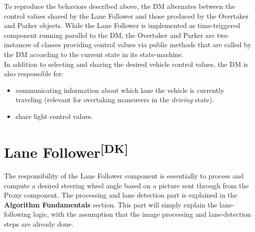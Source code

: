 \noindent
To reproduce the behaviors described above, the DM alternates between the
control values shared by the Lane Follower and those produced by the Overtaker
and Parker objects. While the Lane Follower is implemented as time-triggered
component running parallel to the DM, the Overtaker and Parker are two instances
of classes providing control values via public methods that are called by the DM 
according to the current state in its state-machine.\\

\noindent
In addition to selecting and sharing the desired vehicle control values, the DM
is also responsible for:
\begin{itemize}
\item communicating information about which lane the vehicle is currently
   traveling (relevant for overtaking maneuvers in the \textit{driving} state).
\item share light control values.
\end{itemize}

\section[Lane Follower]{Lane Follower\textsuperscript{[DK]}}
The responsibility of the Lane Follower component is essentially to process and
compute a desired steering wheel angle based on a picture sent through from the
Proxy component.
The processing and lane detection part is explained in the
\textbf{Algorithm Fundamentals} section. This part will simply explain the
lane-following logic, with the assumption that the image processing and
lane-detection steps are already done.\\

